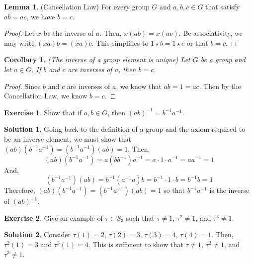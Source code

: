 \documentclass[12pt]{article}
\newtheorem{corollary}{Corollary}
\theoremstyle{definition}
\newtheorem{exercise}{Exercise}
\newtheorem{lemma}{Lemma}
\theoremstyle{definition}
\newtheorem{solution}{Solution}
\begin{document}
\begin{lemma}(Cancellation Law)
For every group $G$ and $a,b,c \in G$ that satisfy $ab = ac$, we have $b=c$.
\end{lemma}
\begin{proof}
Let $x$ be the inverse of $a$. Then, $x(ab) = x(ac)$. Be associativity, we may write $(xa)b = (xa)c$. This simplifies to $1 \star b = 1 \star c$ or that $b = c$.
\end{proof}

\begin{corollary}(The inverse of a group element is unique)
Let $G$ be a group and let $a \in G$. If $b$ and $c$ are inverses of $a$, then $b = c$. 
\end{corollary}
\begin{proof}
Since $b$ and $c$ are inverses of $a$, we know that $ab = 1 = ac$. Then by the Cancellation Law, we know $b=c$.
\end{proof}

\begin{exercise}
Show that if $a,b \in G$, then $(ab)^{-1} = b^{-1}a^{-1}$.
\end{exercise}
\begin{solution} Going back to the definition of a group and the axiom required to be an inverse element, we must show that $(ab)(b^{-1}a^{-1}) = (b^{-1}a^{-1})(ab) = 1$. Then,
\begin{equation}
(ab)(b^{-1}a^{-1}) = a (bb^{-1}) a^{-1} = a \cdot 1 \cdot a^{-1} = aa^{-1} = 1
\end{equation}
And,
\begin{equation}
(b^{-1}a^{-1})(ab) = b^{-1} (a^{-1}a) b = b^{-1} \cdot 1 \cdot b = b^{-1}b = 1
\end{equation}
Therefore, $(ab)(b^{-1}a^{-1}) = (b^{-1}a^{-1})(ab) = 1$ so that $b^{-1}a^{-1}$ is the inverse of $(ab)^{-1}$.
\end{solution}

\begin{exercise}
Give an example of $\tau \in S_3$ such that $\tau \neq 1$, $\tau^2 \neq 1$, and $\tau^3 \neq 1$.
\end{exercise}
\begin{solution}
Consider $\tau(1) = 2$, $\tau(2) = 3$, $\tau(3) = 4$, $\tau(4) = 1$. Then, $\tau^2(1) = 3$ and $\tau^3(1) = 4$. This is sufficient to show that $\tau \neq 1$, $\tau^2 \neq 1$, and $\tau^3 \neq 1$.
\end{solution}
\end{document}
